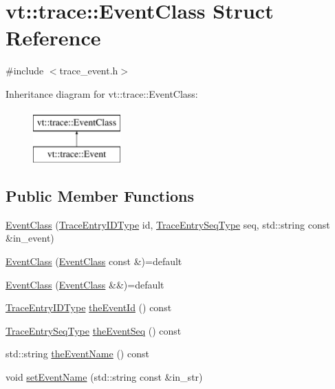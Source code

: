 \hypertarget{structvt_1_1trace_1_1_event_class}{}\section{vt\+:\+:trace\+:\+:Event\+Class Struct Reference}
\label{structvt_1_1trace_1_1_event_class}


{\ttfamily \#include $<$trace\+\_\+event.\+h$>$}

Inheritance diagram for vt\+:\+:trace\+:\+:Event\+Class\+:\begin{figure}[H]
\begin{center}
\leavevmode
\includegraphics[height=2.000000cm]{structvt_1_1trace_1_1_event_class}
\end{center}
\end{figure}
\subsection*{Public Member Functions}
\begin{DoxyCompactItemize}
\item 
\hyperlink{structvt_1_1trace_1_1_event_class_ac9ec736933394fb09a42abf600d691a8}{Event\+Class} (\hyperlink{namespacevt_1_1trace_a3c14050715ba9eceaeff51fb3de64f2f}{Trace\+Entry\+I\+D\+Type} id, \hyperlink{namespacevt_1_1trace_a522028dd2a7d056f0ec3d417836fdecd}{Trace\+Entry\+Seq\+Type} seq, std\+::string const \&in\+\_\+event)
\item 
\hyperlink{structvt_1_1trace_1_1_event_class_a50a0237b8fa6d512720b3aa3830ae30a}{Event\+Class} (\hyperlink{structvt_1_1trace_1_1_event_class}{Event\+Class} const \&)=default
\item 
\hyperlink{structvt_1_1trace_1_1_event_class_ad33692ab53379c2fa9b54a9b8d389c69}{Event\+Class} (\hyperlink{structvt_1_1trace_1_1_event_class}{Event\+Class} \&\&)=default
\item 
\hyperlink{namespacevt_1_1trace_a3c14050715ba9eceaeff51fb3de64f2f}{Trace\+Entry\+I\+D\+Type} \hyperlink{structvt_1_1trace_1_1_event_class_a52d377fa9d26030bb55af4542cedcac4}{the\+Event\+Id} () const
\item 
\hyperlink{namespacevt_1_1trace_a522028dd2a7d056f0ec3d417836fdecd}{Trace\+Entry\+Seq\+Type} \hyperlink{structvt_1_1trace_1_1_event_class_a1bcdfd92ebe57e35dc740550c33fa831}{the\+Event\+Seq} () const
\item 
std\+::string \hyperlink{structvt_1_1trace_1_1_event_class_a471707cbfb7257528c3fa18bbaad485b}{the\+Event\+Name} () const
\item 
void \hyperlink{structvt_1_1trace_1_1_event_class_a853195e5cf52ac0214ff3863218bde81}{set\+Event\+Name} (std\+::string const \&in\+\_\+str)
\end{DoxyCompactItemize}


